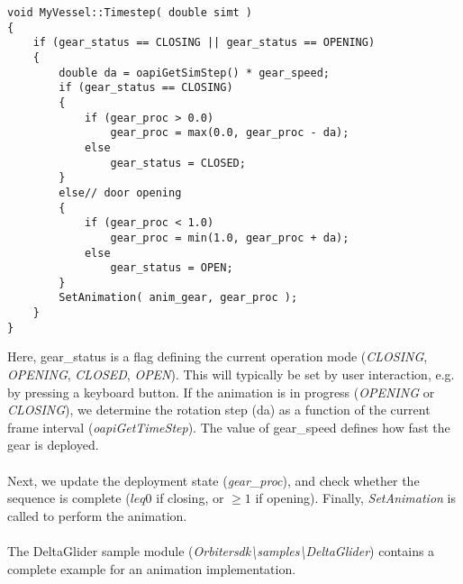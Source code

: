 \documentclass[Orbiter Developer Manual.tex]{subfiles}
\begin{document}
\begin{lstlisting}
void MyVessel::Timestep( double simt )
{
	if (gear_status == CLOSING || gear_status == OPENING)
	{
		double da = oapiGetSimStep() * gear_speed;
		if (gear_status == CLOSING)
		{
			if (gear_proc > 0.0)
				gear_proc = max(0.0, gear_proc - da);
			else
				gear_status = CLOSED;
		}
		else// door opening
		{
			if (gear_proc < 1.0)
				gear_proc = min(1.0, gear_proc + da);
			else
				gear_status = OPEN;
		}
		SetAnimation( anim_gear, gear_proc );
	}
}
\end{lstlisting}

\noindent
Here, gear\_status is a flag defining the current operation mode (\textit{CLOSING}, \textit{OPENING}, \textit{CLOSED}, \textit{OPEN}). This will typically be set by user interaction, e.g. by pressing a keyboard button. If the animation is in progress (\textit{OPENING} or \textit{CLOSING}), we determine the rotation step (da) as a function of the current frame interval (\textit{oapiGetTimeStep}). The value of gear\_speed defines how fast the gear is deployed.\\
\\
Next, we update the deployment state (\textit{gear\_proc}), and check whether the sequence is complete ($leq 0$ if closing, or $\geq 1$ if opening). Finally, \textit{SetAnimation} is called to perform the animation.\\
\\
The DeltaGlider sample module (\textit{Orbitersdk\textbackslash samples\textbackslash DeltaGlider}) contains a complete example for an animation implementation.
\end{document}
